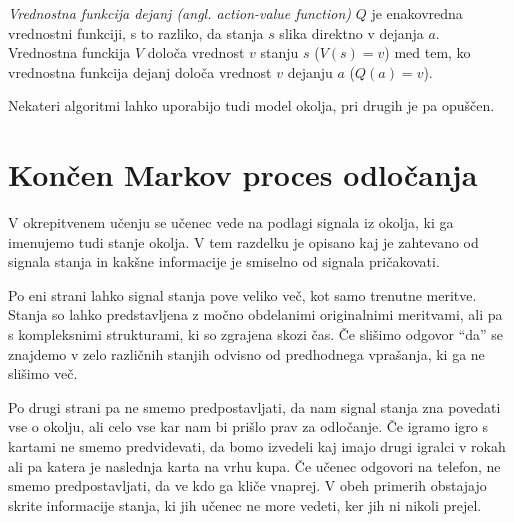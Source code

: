 \documentclass[a4paper, oneside, 12pt]{report}
\begin{document}
{\em Vrednostna funkcija dejanj (angl. action-value function)} $Q$ je enakovredna vrednostni funkciji, s to razliko, da stanja $s$ slika direktno v dejanja $a$. Vrednostna funckija $V$ določa vrednost $v$ stanju $s$ ($V(s) = v$) med tem, ko vrednostna funkcija dejanj določa vrednost $v$ dejanju $a$ ($Q(a) = v$).

Nekateri algoritmi lahko uporabijo tudi model okolja, pri drugih je pa opuščen.

\section{Končen Markov proces odločanja}
V okrepitvenem učenju se učenec vede na podlagi signala iz okolja, ki ga imenujemo tudi stanje okolja. V tem razdelku je opisano kaj je zahtevano od signala stanja in kakšne informacije je smiselno od signala pričakovati.

Po eni strani lahko signal stanja pove veliko več, kot samo trenutne meritve. Stanja so lahko predstavljena z močno obdelanimi originalnimi meritvami, ali pa s kompleksnimi strukturami, ki so zgrajena skozi čas. Če slišimo odgovor ``da'' se znajdemo v zelo različnih stanjih odvisno od predhodnega vprašanja, ki ga ne slišimo več.

Po drugi strani pa ne smemo predpostavljati, da nam signal stanja zna povedati vse o okolju, ali celo vse kar nam bi prišlo prav za odločanje. Če igramo igro s kartami ne smemo predvidevati, da bomo izvedeli kaj imajo drugi igralci v rokah ali pa katera je naslednja karta na vrhu kupa. Če učenec odgovori na telefon, ne smemo predpostavljati, da ve kdo ga kliče vnaprej. V obeh primerih obstajajo skrite informacije stanja, ki jih učenec ne more vedeti, ker jih ni nikoli prejel.
\end{document}
